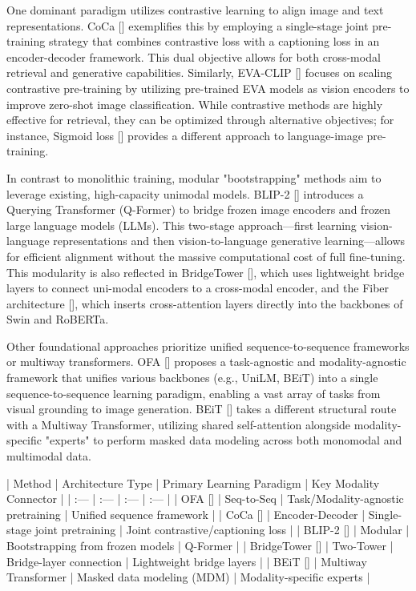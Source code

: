 \documentclass[11pt]{article}
\begin{document}
One dominant paradigm utilizes contrastive learning to align image and text representations. CoCa [\citep{2205.01917}] exemplifies this by employing a single-stage joint pre-training strategy that combines contrastive loss with a captioning loss in an encoder-decoder framework. This dual objective allows for both cross-modal retrieval and generative capabilities. Similarly, EVA-CLIP [\citep{2303.15389}] focuses on scaling contrastive pre-training by utilizing pre-trained EVA models as vision encoders to improve zero-shot image classification. While contrastive methods are highly effective for retrieval, they can be optimized through alternative objectives; for instance, Sigmoid loss [\citep{2303.15343}] provides a different approach to language-image pre-training.

In contrast to monolithic training, modular "bootstrapping" methods aim to leverage existing, high-capacity unimodal models. BLIP-2 [\citep{2301.12597}] introduces a Querying Transformer (Q-Former) to bridge frozen image encoders and frozen large language models (LLMs). This two-stage approach—first learning vision-language representations and then vision-to-language generative learning—allows for efficient alignment without the massive computational cost of full fine-tuning. This modularity is also reflected in BridgeTower [\citep{2206.08657}], which uses lightweight bridge layers to connect uni-modal encoders to a cross-modal encoder, and the Fiber architecture [\citep{2206.07643}], which inserts cross-attention layers directly into the backbones of Swin and RoBERTa.

Other foundational approaches prioritize unified sequence-to-sequence frameworks or multiway transformers. OFA [\citep{2202.03052}] proposes a task-agnostic and modality-agnostic framework that unifies various backbones (e.g., UniLM, BEiT) into a single sequence-to-sequence learning paradigm, enabling a vast array of tasks from visual grounding to image generation. BEiT [\citep{2208.10442}] takes a different structural route with a Multiway Transformer, utilizing shared self-attention alongside modality-specific "experts" to perform masked data modeling across both monomodal and multimodal data.

| Method | Architecture Type | Primary Learning Paradigm | Key Modality Connector |
| :--- | :--- | :--- | :--- |
| OFA [\citep{2202.03052}] | Seq-to-Seq | Task/Modality-agnostic pretraining | Unified sequence framework |
| CoCa [\citep{2205.01917}] | Encoder-Decoder | Single-stage joint pretraining | Joint contrastive/captioning loss |
| BLIP-2 [\citep{2301.12597}] | Modular | Bootstrapping from frozen models | Q-Former |
| BridgeTower [\citep{2206.08657}] | Two-Tower | Bridge-layer connection | Lightweight bridge layers |
| BEiT [\citep{2208.10442}] | Multiway Transformer | Masked data modeling (MDM) | Modality-specific experts |
\end{document}
